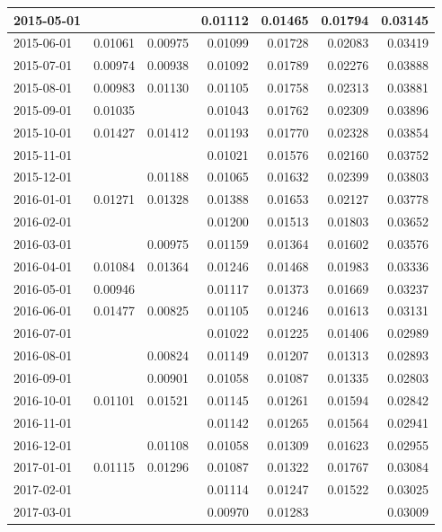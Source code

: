 \documentclass[
]{book}
\begin{document}
\begin{table}
\begin{tabular}[t]{l|r|r|r|r|r|r}
\hline
2015-05-01 &  &  & 0.01112 & 0.01465 & 0.01794 & 0.03145\\
\hline
2015-06-01 & 0.01061 & 0.00975 & 0.01099 & 0.01728 & 0.02083 & 0.03419\\
\hline
2015-07-01 & 0.00974 & 0.00938 & 0.01092 & 0.01789 & 0.02276 & 0.03888\\
\hline
2015-08-01 & 0.00983 & 0.01130 & 0.01105 & 0.01758 & 0.02313 & 0.03881\\
\hline
2015-09-01 & 0.01035 &  & 0.01043 & 0.01762 & 0.02309 & 0.03896\\
\hline
2015-10-01 & 0.01427 & 0.01412 & 0.01193 & 0.01770 & 0.02328 & 0.03854\\
\hline
2015-11-01 &  &  & 0.01021 & 0.01576 & 0.02160 & 0.03752\\
\hline
2015-12-01 &  & 0.01188 & 0.01065 & 0.01632 & 0.02399 & 0.03803\\
\hline
2016-01-01 & 0.01271 & 0.01328 & 0.01388 & 0.01653 & 0.02127 & 0.03778\\
\hline
2016-02-01 &  &  & 0.01200 & 0.01513 & 0.01803 & 0.03652\\
\hline
2016-03-01 &  & 0.00975 & 0.01159 & 0.01364 & 0.01602 & 0.03576\\
\hline
2016-04-01 & 0.01084 & 0.01364 & 0.01246 & 0.01468 & 0.01983 & 0.03336\\
\hline
2016-05-01 & 0.00946 &  & 0.01117 & 0.01373 & 0.01669 & 0.03237\\
\hline
2016-06-01 & 0.01477 & 0.00825 & 0.01105 & 0.01246 & 0.01613 & 0.03131\\
\hline
2016-07-01 &  &  & 0.01022 & 0.01225 & 0.01406 & 0.02989\\
\hline
2016-08-01 &  & 0.00824 & 0.01149 & 0.01207 & 0.01313 & 0.02893\\
\hline
2016-09-01 &  & 0.00901 & 0.01058 & 0.01087 & 0.01335 & 0.02803\\
\hline
2016-10-01 & 0.01101 & 0.01521 & 0.01145 & 0.01261 & 0.01594 & 0.02842\\
\hline
2016-11-01 &  &  & 0.01142 & 0.01265 & 0.01564 & 0.02941\\
\hline
2016-12-01 &  & 0.01108 & 0.01058 & 0.01309 & 0.01623 & 0.02955\\
\hline
2017-01-01 & 0.01115 & 0.01296 & 0.01087 & 0.01322 & 0.01767 & 0.03084\\
\hline
2017-02-01 &  &  & 0.01114 & 0.01247 & 0.01522 & 0.03025\\
\hline
2017-03-01 &  &  & 0.00970 & 0.01283 &  & 0.03009\\

\end{tabular}
\end{table}
\end{document}
